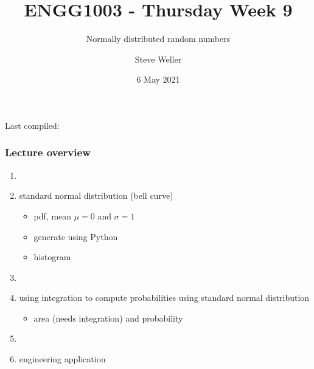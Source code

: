 \documentclass[english,14pt]{beamer}
\title{ENGG1003 - Thursday Week 9}
\subtitle{Normally distributed random numbers}
\author{Steve Weller}
\institute{University of Newcastle}
\date{6 May 2021}
\begin{document}
\begin{flushleft}
{\scriptsize Last compiled:~\DTMnow}
\vspace*{-5mm}
\end{flushleft}
\framebreak


\begin{frame}[fragile]

\frametitle{Lecture overview}
\begin{enumerate}

	\item[]
	
	\item standard normal distribution (bell curve)
	\begin{itemize}
		\item pdf, mean $\mu = 0$ and $\sigma = 1$ %
		\item generate using Python
		\item histogram
	\end{itemize}
	
	\item[]
	
	\item using integration to compute probabilities using standard normal distribution
	\begin{itemize}
		\item area (needs integration) and probability
	\end{itemize}
	
%	
	
	\item[]
	
	\item engineering application
	
\end{enumerate}

\end{frame}
\end{document}
